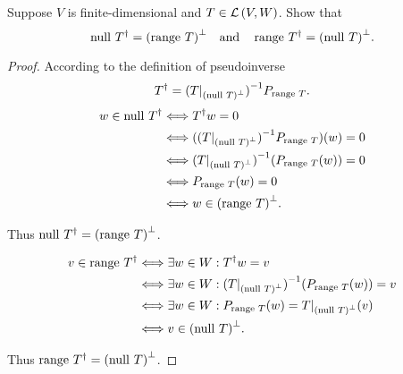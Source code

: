 \begin{exercise}\label{chapter6:sectionC:exercise20}
    Suppose $V$ is finite-dimensional and $T\in \mathcal{L}\left({V, W}\right)$. Show that
    \[
        \operatorname{null}\,{T^{\dagger}} = {(\operatorname{range}\,{T})}^{\bot} \quad \text{and} \quad \operatorname{range}\,{T^{\dagger}} = {(\operatorname{null}\,{T})}^{\bot}.
    \]
\end{exercise}

\begin{proof}
    According to the definition of pseudoinverse
    \[
        T^{\dagger} = {(T\vert_{{(\operatorname{null}\,{T})}^{\bot}})}^{-1}P_{\operatorname{range}\,{T}}.
    \]
    \begin{align*}
        w\in \operatorname{null}\,{T^{\dagger}} & \Longleftrightarrow T^{\dagger}w = 0                                              \\
                                  & \Longleftrightarrow ({(T\vert_{{(\operatorname{null}\,{T})}^{\bot}})}^{-1}P_{\operatorname{range}\,{T}})(w) = 0 \\
                                  & \Longleftrightarrow {(T\vert_{{(\operatorname{null}\,{T})}^{\bot}})}^{-1}(P_{\operatorname{range}\,{T}}(w)) = 0 \\
                                  & \Longleftrightarrow P_{\operatorname{range}\,{T}}(w) = 0                                          \\
                                  & \Longleftrightarrow w\in {(\operatorname{range}\,{T})}^{\bot}.
    \end{align*}

    Thus $\operatorname{null}\,{T^{\dagger}} = {(\operatorname{range}\,{T})}^{\bot}$.

    \begin{align*}
        v\in \operatorname{range}\,{T^{\dagger}} & \Longleftrightarrow \exists w\in W: T^{\dagger}w = v                                              \\
                                 & \Longleftrightarrow \exists w\in W: {(T\vert_{{(\operatorname{null}\,{T})}^{\bot}})}^{-1}(P_{\operatorname{range}\,{T}}(w)) = v \\
                                 & \Longleftrightarrow \exists w\in W: P_{\operatorname{range}\,{T}}(w) = T\vert_{{(\operatorname{null}\,{T})}^{\bot}}(v)          \\
                                 & \Longleftrightarrow v\in {(\operatorname{null}\,{T})}^{\bot}.
    \end{align*}

    Thus $\operatorname{range}\,{T^{\dagger}} = {(\operatorname{null}\,{T})}^{\bot}$.
\end{proof}
\newpage

